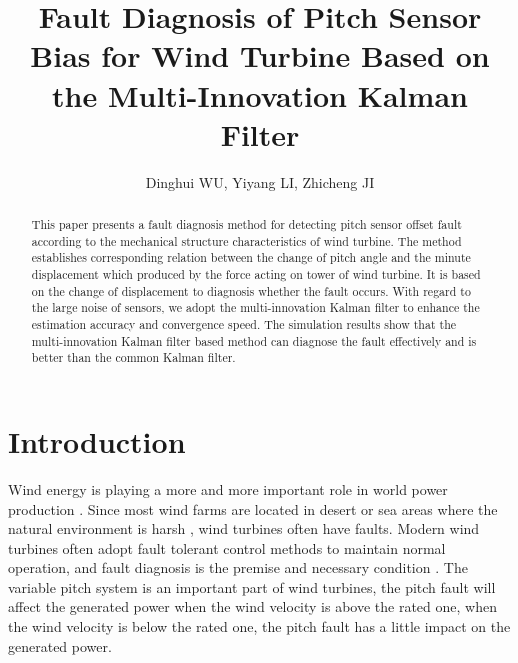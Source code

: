 \documentclass{article}
\begin{document}
\title{Fault Diagnosis of Pitch Sensor Bias for Wind Turbine Based on the Multi-Innovation Kalman Filter}

\author{Dinghui WU,
        Yiyang LI,
        Zhicheng JI}
\date{}
\maketitle


\begin{abstract}
This paper presents a fault diagnosis method for detecting pitch sensor
offset fault according to the mechanical structure characteristics of wind turbine.
The method establishes corresponding relation between the change of pitch angle
and the minute displacement which produced by the force acting on tower of
wind turbine. It is based on the change of displacement to diagnosis whether
the fault occurs. With regard to the large noise of sensors, we adopt the
multi-innovation Kalman filter to enhance the estimation accuracy and
convergence speed. The simulation results show that the multi-innovation
Kalman filter based method can diagnose the fault effectively and is
better than the common Kalman filter.
\end{abstract}





\section{Introduction}


Wind energy is playing a more and more important role in world power
production \cite{ref:1}. Since most wind farms are located in desert or sea
areas where the natural environment is harsh \cite{ref:2},
wind turbines often have faults. Modern wind turbines often adopt fault
tolerant control methods to maintain normal operation, and fault
diagnosis is the premise and necessary condition \cite{ref:3}. The variable pitch
system is an important part of wind turbines, the pitch fault
will affect the generated power when the wind velocity is above the rated
one, when the wind velocity is below the rated one, the pitch fault has
a little impact on the generated power.
\end{document}
